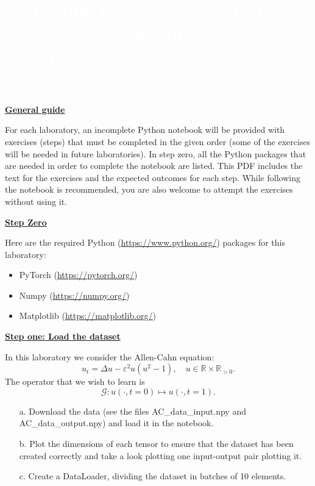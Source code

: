 \documentclass{article}
\title{\textcolor{white}{\textbf{Machine Learning per il Calcolo Scientifico}\\ \small\textbf{Fifth laboratory exercises }}}
\date{}
\newcommand{\step}[1]{\underline{\textbf{\large{#1}}} }
\begin{document}
\AddToShipoutPicture*
{%
  \AtPageUpperLeft
  {%
    \color{bluunipv}%
    \raisebox{-.1\paperheight}{\rule{\paperwidth}{.5\paperheight}}%

  }%
}

\maketitle

\begin{center}\step{General guide} \end{center}
\noindent
For each laboratory, an incomplete Python notebook will be provided with exercises (steps) that must be completed in the given order (some of the exercises will be needed in future laboratories). In step zero, all the Python packages that are needed in order to complete the notebook are listed. This PDF includes the text for the exercises and the expected outcomes for each step. While following the notebook is recommended, you are also welcome to attempt the exercises without using it.

\begin{center}\step{Step Zero} \end{center}

Here are the required Python (\url{https://www.python.org/}) packages for this laboratory:
\begin{itemize}
  \item PyTorch (\url{https://pytorch.org/})
  \item Numpy (\url{https://numpy.org/})
  \item Matplotlib (\url{https://matplotlib.org/})
\end{itemize}

\begin{center}\step{Step one: Load the dataset}\end{center}

In this laboratory we consider the Allen-Cahn equation:
$$u_t = \Delta u - \varepsilon^2 u (u^2 - 1),\quad u\in\mathbb{R} \times\mathbb{R}_{>0}.$$
\noindent
The operator that we wish to learn is
$$\mathcal{G}: u(\cdot, t = 0) \mapsto  u(\cdot, t = 1).$$
\begin{itemize}
  \item[a.] Download the data (see the files AC\_data\_input.npy and AC\_data\_output.npy) and load it in the notebook.
  \item[b.] Plot the dimensions of each tensor to ensure that the dataset has been created correctly and take a look plotting one input-output pair plotting it.
  \item[c.] Create a DataLoader, dividing the dataset in batches of 10 elements.
\end{itemize}
\end{document}
